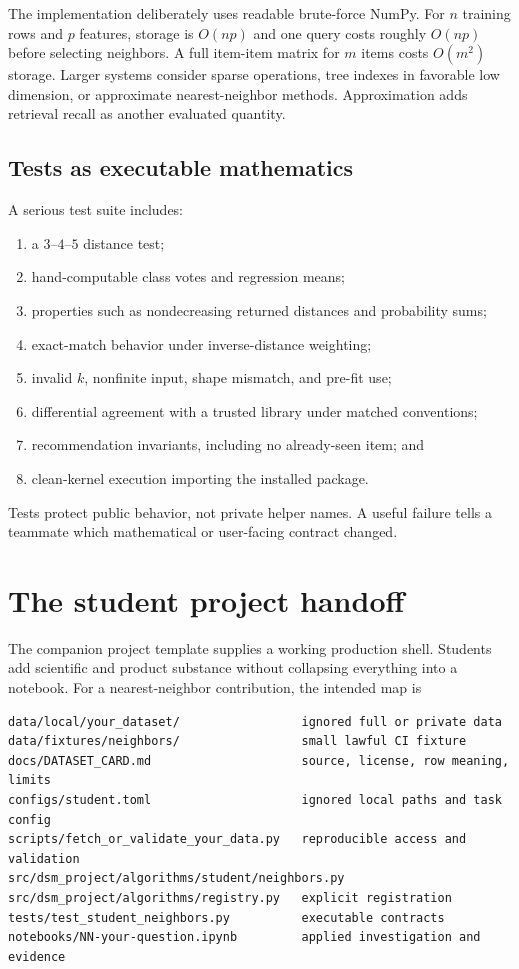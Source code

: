 The implementation deliberately uses readable brute-force NumPy. For $n$
training rows and $p$ features, storage is $O(np)$ and one query costs roughly
$O(np)$ before selecting neighbors. A full item-item matrix for $m$ items costs
$O(m^2)$ storage. Larger systems consider sparse operations, tree indexes in
favorable low dimension, or approximate nearest-neighbor methods. Approximation
adds retrieval recall as another evaluated quantity.

\subsection{Tests as executable mathematics}

A serious test suite includes:
\begin{enumerate}
  \item a $3$--$4$--$5$ distance test;
  \item hand-computable class votes and regression means;
  \item properties such as nondecreasing returned distances and probability
  sums;
  \item exact-match behavior under inverse-distance weighting;
  \item invalid $k$, nonfinite input, shape mismatch, and pre-fit use;
  \item differential agreement with a trusted library under matched
  conventions;
  \item recommendation invariants, including no already-seen item; and
  \item clean-kernel execution importing the installed package.
\end{enumerate}
Tests protect public behavior, not private helper names. A useful failure tells
a teammate which mathematical or user-facing contract changed.

\section{The student project handoff}

The companion project template supplies a working production shell. Students
add scientific and product substance without collapsing everything into a
notebook. For a nearest-neighbor contribution, the intended map is
\begin{verbatim}
data/local/your_dataset/                 ignored full or private data
data/fixtures/neighbors/                 small lawful CI fixture
docs/DATASET_CARD.md                     source, license, row meaning, limits
configs/student.toml                     ignored local paths and task config
scripts/fetch_or_validate_your_data.py   reproducible access and validation
src/dsm_project/algorithms/student/neighbors.py
src/dsm_project/algorithms/registry.py   explicit registration
tests/test_student_neighbors.py          executable contracts
notebooks/NN-your-question.ipynb         applied investigation and evidence
\end{verbatim}

